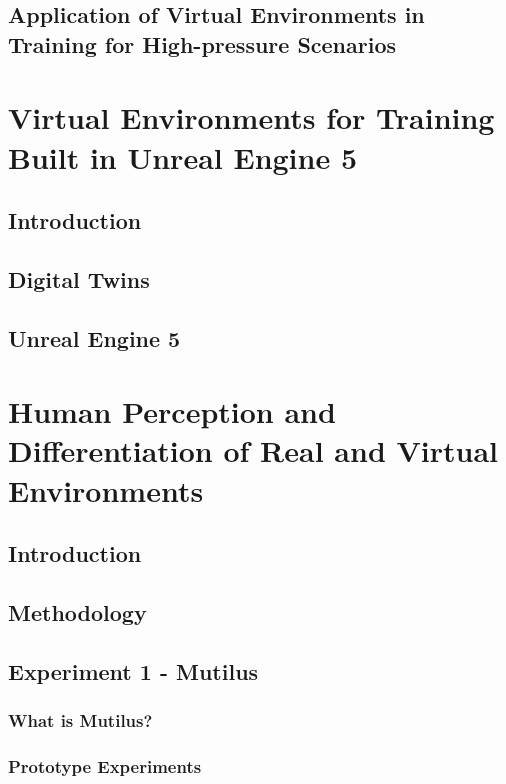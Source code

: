 \documentclass[12pt]{article}
\begin{document}
\subsection{Application of Virtual Environments in Training for High-pressure Scenarios}

\section{Virtual Environments for Training Built in Unreal Engine 5}

\subsection{Introduction}

\subsection{Digital Twins}

\subsection{Unreal Engine 5}

\section{Human Perception and Differentiation of Real and Virtual Environments}

\subsection{Introduction}

\subsection{Methodology}

\subsection{Experiment 1 - Mutilus}

\subsubsection{What is Mutilus?}

\subsubsection{Prototype Experiments}
\end{document}
